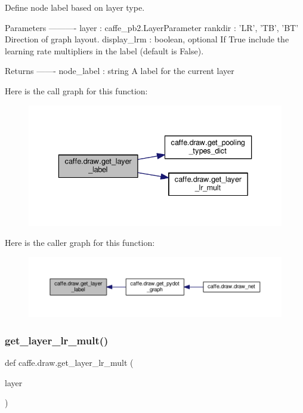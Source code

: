 \begin{DoxyVerb}Define node label based on layer type.

Parameters
----------
layer : caffe_pb2.LayerParameter
rankdir : {'LR', 'TB', 'BT'}
    Direction of graph layout.
display_lrm : boolean, optional
    If True include the learning rate multipliers in the label (default is
    False).

Returns
-------
node_label : string
    A label for the current layer
\end{DoxyVerb}
 Here is the call graph for this function\+:
\nopagebreak
\begin{figure}[H]
\begin{center}
\leavevmode
\includegraphics[width=336pt]{namespacecaffe_1_1draw_a1ab4383ec4e16ed4e8f0e027c25c682a_cgraph}
\end{center}
\end{figure}
Here is the caller graph for this function\+:
\nopagebreak
\begin{figure}[H]
\begin{center}
\leavevmode
\includegraphics[width=350pt]{namespacecaffe_1_1draw_a1ab4383ec4e16ed4e8f0e027c25c682a_icgraph}
\end{center}
\end{figure}
\mbox{\label{namespacecaffe_1_1draw_ac1df68579f91acefee36f75ac5b0de1d}} 
\subsubsection{\texorpdfstring{get\+\_\+layer\+\_\+lr\+\_\+mult()}{get\_layer\_lr\_mult()}}
{\footnotesize\ttfamily def caffe.\+draw.\+get\+\_\+layer\+\_\+lr\+\_\+mult (\begin{DoxyParamCaption}\item[{}]{layer }\end{DoxyParamCaption})}


